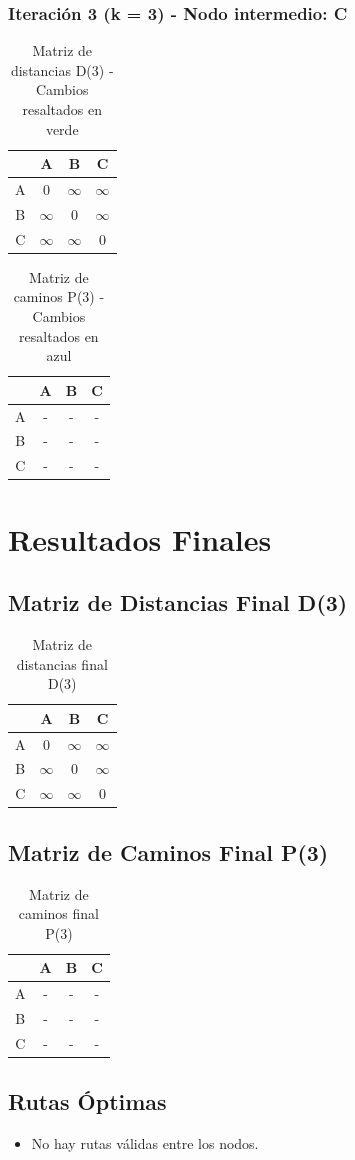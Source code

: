 \documentclass[12pt]{article}
\begin{document}
\subsubsection{Iteración 3 (k = 3) - Nodo intermedio: C}
\begin{table}[h!]
\centering
\begin{tabular}{|c|c|c|c|}
\hline
 & A & B & C \\\hline
A & 0 & $\infty$ & $\infty$ \\\hline
B & $\infty$ & 0 & $\infty$ \\\hline
C & $\infty$ & $\infty$ & 0 \\\hline
\end{tabular}
\caption{Matriz de distancias D(3) - Cambios resaltados en verde}
\end{table}

\begin{table}[h!]
\centering
\begin{tabular}{|c|c|c|c|}
\hline
 & A & B & C \\\hline
A & - & - & - \\\hline
B & - & - & - \\\hline
C & - & - & - \\\hline
\end{tabular}
\caption{Matriz de caminos P(3) - Cambios resaltados en azul}
\end{table}

\clearpage
\section{Resultados Finales}
\subsection{Matriz de Distancias Final D(3)}
\begin{table}[h!]
\centering
\begin{tabular}{|c|c|c|c|}
\hline
 & A & B & C \\\hline
A & 0 & $\infty$ & $\infty$ \\\hline
B & $\infty$ & 0 & $\infty$ \\\hline
C & $\infty$ & $\infty$ & 0 \\\hline
\end{tabular}
\caption{Matriz de distancias final D(3)}
\end{table}

\clearpage
\subsection{Matriz de Caminos Final P(3)}
\begin{table}[h!]
\centering
\begin{tabular}{|c|c|c|c|}
\hline
 & A & B & C \\\hline
A & - & - & - \\\hline
B & - & - & - \\\hline
C & - & - & - \\\hline
\end{tabular}
\caption{Matriz de caminos final P(3)}
\end{table}

\clearpage
\subsection{Rutas Óptimas}
\begin{itemize}
\item No hay rutas válidas entre los nodos.
\end{itemize}
\end{document}
